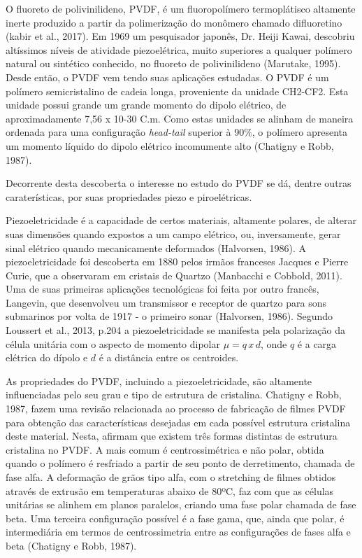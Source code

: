 \documentclass[
	12pt,				
	oneside,			
	a4paper,			
	english,			
	brazil				
	]{abntex2ppgsi}
\begin{document}
O fluoreto de polivinilideno, PVDF, é um fluoropolímero termoplátisco altamente inerte produzido a partir da polimerização do monômero chamado difluoretino (kabir et al., 2017). Em 1969 um pesquisador japonês, Dr. Heiji Kawai, descobriu altíssimos níveis de atividade piezoelétrica, muito superiores a qualquer polímero natural ou sintético conhecido, no fluoreto de polivinilideno (Marutake, 1995). Desde então, o PVDF vem tendo suas aplicações estudadas. O PVDF é um polímero semicristalino de cadeia longa, proveniente da unidade CH2-CF2. Esta unidade possui grande um grande momento do dipolo elétrico, de aproximadamente 7,56 x 10-30 C.m. Como estas unidades se alinham de maneira ordenada para uma configuração \textit{head-tail} superior à 90\%, o polímero apresenta um momento líquido do dipolo elétrico incomumente alto (Chatigny e Robb, 1987).

Decorrente desta descoberta o interesse no estudo do PVDF se dá, dentre outras caraterísticas, por suas propriedades piezo e piroelétricas. 

Piezoeletricidade é a capacidade de certos materiais, altamente polares, de alterar suas dimensões quando expostos a um campo elétrico, ou, inversamente, gerar sinal elétrico quando mecanicamente deformados (Halvorsen, 1986). A piezoeletricidade foi descoberta em 1880 pelos irmãos franceses Jacques e Pierre Curie, que a observaram em cristais de Quartzo (Manbacchi e Cobbold, 2011). Uma de suas primeiras aplicações tecnológicas foi feita por outro francês, Langevin, que desenvolveu um transmissor e receptor de quartzo para sons submarinos por volta de 1917 - o primeiro sonar (Halvorsen, 1986). Segundo Loussert et al., 2013, p.204 a piezoeletricidade se manifesta pela polarização da célula unitária com o aspecto de momento dipolar $\mu = q \,x \, d$, onde $q$ é a carga elétrica do dípolo e $d$ é a distância entre os centroides.  

As propriedades do PVDF, incluindo a piezoeletricidade, são altamente influenciadas pelo seu grau e tipo de estrutura de cristalina. Chatigny e Robb, 1987, fazem uma revisão relacionada ao processo de fabricação de filmes PVDF para obtenção das características desejadas em cada possível estrutura cristalina deste material. Nesta, afirmam que existem três formas distintas de estrutura cristalina no PVDF. A mais comum é centrossimétrica e não polar, obtida quando o polímero é resfriado a partir de seu ponto de derretimento, chamada de fase alfa. A deformação de grãos tipo alfa, com o stretching de filmes obtidos através de extrusão em temperaturas abaixo de 80ºC, faz com que as células unitárias se alinhem em planos paralelos, criando uma fase polar chamada de fase beta. Uma terceira configuração possível é a fase gama, que, ainda que polar, é intermediária em termos de centrossimetria entre as configurações de fases alfa e beta (Chatigny e Robb, 1987).
\end{document}
